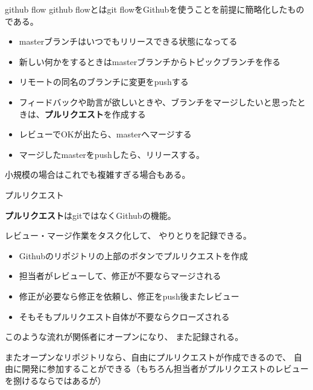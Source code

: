 \documentclass[12pt, unicode]{beamer}
\begin{document}
\begin{frame}{github flow}
github flowとはgit flowをGithubを使うことを前提に簡略化したものである。

\begin{itemize}
\item masterブランチはいつでもリリースできる状態になってる
\item 新しい何かをするときはmasterブランチからトピックブランチを作る
\item リモートの同名のブランチに変更をpushする
\item フィードバックや助言が欲しいときや、ブランチをマージしたいと思ったときは、\textbf{プルリクエスト}を作成する
\item レビューでOKが出たら、masterへマージする
\item マージしたmasterをpushしたら、リリースする。
\end{itemize}

小規模の場合はこれでも複雑すぎる場合もある。

\end{frame}
\begin{frame}{プルリクエスト}

\textbf{プルリクエスト}はgitではなくGithubの機能。

レビュー・マージ作業をタスク化して、
やりとりを記録できる。

\begin{itemize}
\item Githubのリポジトリの上部のボタンでプルリクエストを作成
\item 担当者がレビューして、修正が不要ならマージされる
\item 修正が必要なら修正を依頼し、修正をpush後またレビュー
\item そもそもプルリクエスト自体が不要ならクローズされる
\end{itemize}

このような流れが関係者にオープンになり、
また記録される。

またオープンなリポジトリなら、自由にプルリクエストが作成できるので、
自由に開発に参加することができる（もちろん担当者がプルリクエストのレビューを捌けるならではあるが）

\end{frame}
\end{document}
